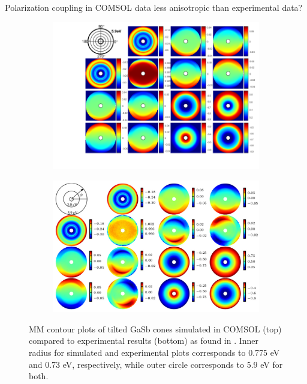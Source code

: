Polarization coupling in COMSOL data less anisotropic than experimental data?
\begin{figure}[h!]
    \begin{subfigure}{\textwidth}
        \centering
        \includegraphics[width=\linewidth, trim=2cm 1.5cm 0cm 0cm, clip]{figures/ch4/gasb/contour/GaSbCones_contour_MM.png}   
    \end{subfigure}
    
    \begin{subfigure}{\textwidth}
        \centering
        \includegraphics[width=0.9\linewidth]{figures/ch4/gasb/expdata/GasB_exp_contour_MM_theta45.PNG}  
    \end{subfigure}
    \label{fig:gasb_contour_MM_simvsexp}
    \caption{MM contour plots of tilted GaSb cones simulated in COMSOL (top) compared to experimental results (bottom) as found in \cite{gasbcones}. Inner radius for simulated and experimental plots corresponds to 0.775 eV and 0.73 eV, respectively, while outer circle corresponds to 5.9 eV for both.} %
\end{figure}

